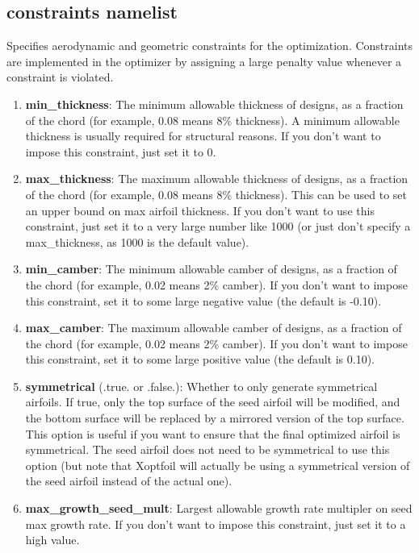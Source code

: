 \documentclass[11pt]{article}
\begin{document}
\subsection{constraints namelist}

Specifies aerodynamic and geometric constraints for the optimization.  Constraints are
implemented in the optimizer by assigning a large penalty value whenever a constraint is
violated.

\begin{enumerate}
\item{\textbf{min\_thickness}: The minimum allowable thickness of designs, as a
fraction of the chord (for example, 0.08 means 8\% thickness).  A minimum allowable
thickness is usually required for structural reasons.  If you don't want to impose this
constraint, just set it to 0.}

\item{\textbf{max\_thickness}: The maximum allowable thickness of designs, as a
fraction of the chord (for example, 0.08 means 8\% thickness). This can be used to set an
upper bound on max airfoil thickness.  If you don't want to use this constraint, just set
it to a very large number like 1000 (or just don't specify a max\_thickness, as 1000 is
the default value).}

\item{\textbf{min\_camber}: The minimum allowable camber of designs, as a fraction of the
chord (for example, 0.02 means 2\% camber). If you don't want to impose this constraint,
set it to some large negative value (the default is -0.10).}

\item{\textbf{max\_camber}: The maximum allowable camber of designs, as a fraction of the
chord (for example, 0.02 means 2\% camber). If you don't want to impose this constraint,
set it to some large positive value (the default is 0.10).}

\item{\textbf{symmetrical} (.true. or .false.): Whether to only generate symmetrical 
	airfoils.  If true, only the top surface of the seed airfoil will be modified, and the
	bottom surface will be replaced by a mirrored version of the top surface. This option is
	useful if you want to ensure that the final optimized airfoil is symmetrical.  The seed 
	airfoil does not need
	to be symmetrical to use this option (but note that Xoptfoil will actually be using a
	symmetrical version of the seed airfoil instead of the actual one).}

\item{\textbf{max\_growth\_seed\_mult}: Largest allowable growth rate multipler on seed max growth rate. 
	If you don't want to impose this constraint, just set it to a high value.}


\end{enumerate}
\end{document}
